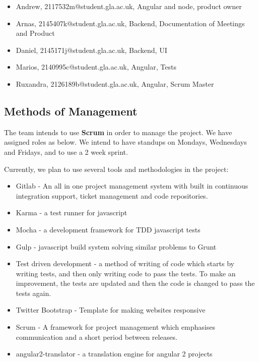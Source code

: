 \documentclass[10pt,a4paper]{article}
\begin{document}
\begin{itemize}

\item
Andrew, 2117532m@student.gla.ac.uk, Angular and node, product owner
\item
Arnas, 2145407k@student.gla.ac.uk, Backend, Documentation of Meetings and Product
\item
Daniel, 2145171j@student.gla.ac.uk, Backend, UI
\item
Marios, 2140995c@student.gla.ac.uk, Angular, Tests
\item
Ruxandra, 2126189b@student.gla.ac.uk, Angular, Scrum Master

\end{itemize}

\subsection{Methods of Management}
The team intends to use \textbf{Scrum} in order to manage the project. We have assigned roles as below. We intend to have standups on Mondays, Wednesdays and Fridays, and to use a 2 week sprint.



Currently, we plan to use several tools and methodologies in the project:
\begin{itemize}

\item
Gitlab - An all in one project management system with built in continuous integration support, ticket management and code repositories. 

\item 
Karma - a test runner for javascript

\item
Mocha - a development framework for TDD javascript tests

\item
Gulp - javascript build system solving similar problems to Grunt

\item
Test driven development - a method of writing of code which starts by writing tests, and then only writing code to pass the tests. To make an improvement, the tests are updated and then the code is changed to pass the tests again.

\item
Twitter Bootstrap - Template for making websites responsive

\item
Scrum - A framework for project management which emphasises communication and a short period between releases.

\item 
angular2-translator - a translation engine for angular 2 projects
\end{itemize}
\end{document}

